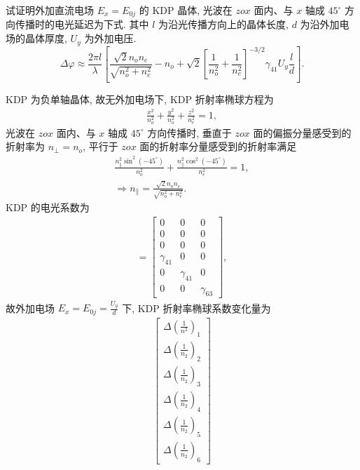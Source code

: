 \documentclass{assignment}
\begin{document}
\begin{prob}
    试证明外加直流电场 $E_x=E_{0j}$ 的 KDP 晶体, 光波在 $zox$ 面内、与 $x$ 轴成 $45^{\circ}$ 方向传播时的电光延迟为下式. 其中 $l$ 为沿光传播方向上的晶体长度, $d$ 为沿外加电场的晶体厚度, $U_y$ 为外加电压.
    \[
        \Delta\varphi\approx\frac{2\pi l}{\lambda}\left[\frac{\sqrt{2}n_on_e}{\sqrt{n_o^2+n_e^2}}-n_o+\sqrt{2}\left[\frac{1}{n_o^2}+\frac{1}{n_e^2}\right]^{-3/2}\gamma_{41}U_y\frac{l}{d}\right].
    \]
\end{prob}
\begin{pf}
    KDP 为负单轴晶体, 故无外加电场下, KDP 折射率椭球方程为
    \begin{align}
        \frac{x^2}{n_o^2}+\frac{y^2}{n_o^2}+\frac{z^2}{n_e^2}=1,
    \end{align}
    光波在 $zox$ 面内、与 $x$ 轴成 $45^{\circ}$ 方向传播时, 垂直于 $zox$ 面的偏振分量感受到的折射率为 $n_{\perp}=n_o$, 平行于 $zox$ 面的折射率分量感受到的折射率满足
    \begin{gather}
        \frac{n_{\parallel}^2\sin^2(-45^{\circ})}{n_o^2}+\frac{n_{\parallel}^2\cos^2(-45^{\circ})}{n_e^2}=1,\\
        \Longrightarrow n_{\parallel}=\frac{\sqrt{2}n_on_e}{\sqrt{n_o^2+n_e^2}}.
    \end{gather}
    KDP 的电光系数为
    \begin{align}
        [\gamma_{ij}]=\begin{bmatrix}
            0&0&0\\
            0&0&0\\
            0&0&0\\
            \gamma_{41}&0&0\\
            0&\gamma_{41}&0\\
            0&0&\gamma_{63}
        \end{bmatrix},
    \end{align}
    故外加电场 $E_x=E_{0j}=\frac{U_y}{d}$ 下, KDP 折射率椭球系数变化量为
    \begin{align}
        \begin{bmatrix}
            \Delta\left(\frac{1}{n^2}\right)_1\\
            \Delta\left(\frac{1}{n_2}\right)_2\\
            \Delta\left(\frac{1}{n_2}\right)_3\\
            \Delta\left(\frac{1}{n_2}\right)_4\\
            \Delta\left(\frac{1}{n_2}\right)_5\\
            \Delta\left(\frac{1}{n_2}\right)_6

\end{bmatrix}
\end{align}
\end{pf}
\end{document}

